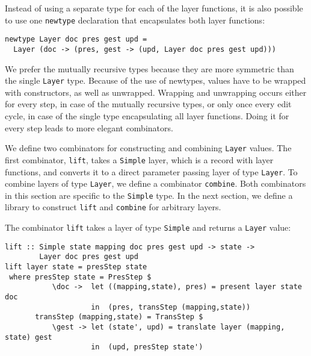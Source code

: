 Instead of using a separate type for each of the layer functions, it is also possible to use one \texttt{newtype} declaration that encapsulates both layer functions:

\begin{small}
\begin{verbatim}
newtype Layer doc pres gest upd = 
  Layer (doc -> (pres, gest -> (upd, Layer doc pres gest upd)))
\end{verbatim}
\end{small}

We prefer the mutually recursive types because they are more symmetric than the single \texttt{Layer} type. Because of the use of newtypes, values have to be wrapped with constructors, as well as unwrapped. Wrapping and unwrapping occurs either for every step, in case of the mutually recursive types, or only once every edit cycle, in case of the single type encapsulating all layer functions. Doing it for every step leads to more elegant combinators.

We define two combinators for constructing and combining \texttt{Layer} values. The first combinator, \texttt{lift}, takes a \texttt{Simple} layer, which is a record with layer functions, and converts it to a direct parameter passing layer of type \texttt{Layer}. To combine layers of type \texttt{Layer}, we define a combinator \texttt{combine}. Both combinators in this section are specific to the \texttt{Simple} type. In the next section, we define a library to construct \texttt{lift} and \texttt{combine} for arbitrary layers.


The combinator \texttt{lift} takes a layer of type \texttt{Simple} and returns a \texttt{Layer} value:

\begin{small}
\begin{verbatim}
lift :: Simple state mapping doc pres gest upd -> state -> 
        Layer doc pres gest upd
lift layer state = presStep state 
 where presStep state = PresStep $
           \doc ->  let ((mapping,state), pres) = present layer state doc                                         
                    in  (pres, transStep (mapping,state))
       transStep (mapping,state) = TransStep $
           \gest -> let (state', upd) = translate layer (mapping, state) gest                     
                    in  (upd, presStep state')
\end{verbatim}
\end{small}

